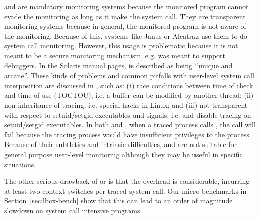  and  are mandatory monitoring
systems because the monitored program cannot evade the monitoring as long
as it make the system call.
They are transparent monitoring systems because in general,
the monitored program is not aware of the monitoring.
Because of this,
systems like Janus \cite{wagner1999janus} or
Alcatraz \cite{liang2009alcatraz} use them to do system call monitoring.
However, this usage is problematic because it is not
meant to be a secure monitoring mechanism, e.g.
 was meant to support debuggers.
In the Solaris manual pages,  is described as being
``unique and arcane''.
These kinds of problems and common
pitfalls with user-level system call interposition
are discussed in \cite{garfinkel2003traps}, such as:
(i) race conditions between time of check and time of use (TOCTOU), 
i.e. a buffer can be modified by another thread;
(ii) non-inheritance of tracing, i.e. special  hacks in Linux;
and (iii) not transparent with respect to setuid/setgid executables 
and signals,
i.e.  and  disable tracing 
on setuid/setgid executables.  
In both  and , when a traced process calls ,
the call will fail because the tracing process would have insufficient
privileges to the  process.
Because of their subtleties and intrinsic difficulties,
 and  are not suitable for general purpose user-level
monitoring although they may be useful in specific situations.


The other serious drawback of  or  is that
the overhead is considerable, incurring at least two
context switches per traced system call.
Our micro benchmarks in Section~\ref{sec:lbox-bench} show that
this can lead to an order of magnitude
slowdown on system call intensive programs.

